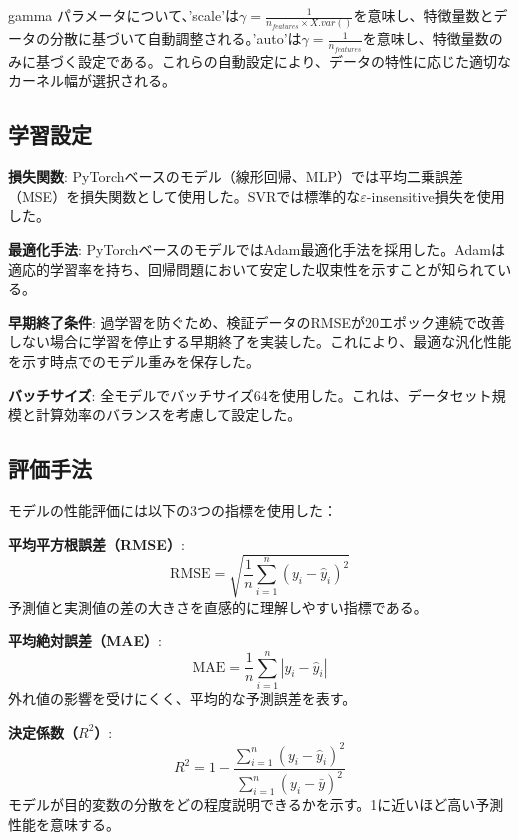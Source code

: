 \documentclass[12pt,a4paper,dvipdfmx]{jsarticle}
\begin{document}
gamma パラメータについて、'scale'は$\gamma = \frac{1}{n_{features} \times X.var()}$を意味し、特徴量数とデータの分散に基づいて自動調整される。'auto'は$\gamma = \frac{1}{n_{features}}$を意味し、特徴量数のみに基づく設定である。これらの自動設定により、データの特性に応じた適切なカーネル幅が選択される。

\subsection{学習設定}

\textbf{損失関数}: PyTorchベースのモデル（線形回帰、MLP）では平均二乗誤差（MSE）を損失関数として使用した。SVRでは標準的な$\varepsilon$-insensitive損失を使用した。

\textbf{最適化手法}: PyTorchベースのモデルではAdam最適化手法を採用した。Adamは適応的学習率を持ち、回帰問題において安定した収束性を示すことが知られている。

\textbf{早期終了条件}: 過学習を防ぐため、検証データのRMSEが20エポック連続で改善しない場合に学習を停止する早期終了を実装した。これにより、最適な汎化性能を示す時点でのモデル重みを保存した。

\textbf{バッチサイズ}: 全モデルでバッチサイズ64を使用した。これは、データセット規模と計算効率のバランスを考慮して設定した。

\subsection{評価手法}

モデルの性能評価には以下の3つの指標を使用した：

\textbf{平均平方根誤差（RMSE）}: 
\begin{equation}
    \text{RMSE} = \sqrt{\frac{1}{n} \sum_{i=1}^{n}(y_i - \hat{y}_i)^2}
\end{equation}
予測値と実測値の差の大きさを直感的に理解しやすい指標である。

\textbf{平均絶対誤差（MAE）}: 
\begin{equation}
    \text{MAE} = \frac{1}{n} \sum_{i=1}^{n}|y_i - \hat{y}_i|
\end{equation}
外れ値の影響を受けにくく、平均的な予測誤差を表す。

\textbf{決定係数（$R^2$）}: 
\begin{equation}
    R^2 = 1 - \frac{\sum_{i=1}^{n}(y_i - \hat{y}_i)^2}{\sum_{i=1}^{n}(y_i - \bar{y})^2}
\end{equation}
モデルが目的変数の分散をどの程度説明できるかを示す。1に近いほど高い予測性能を意味する。
\end{document}
